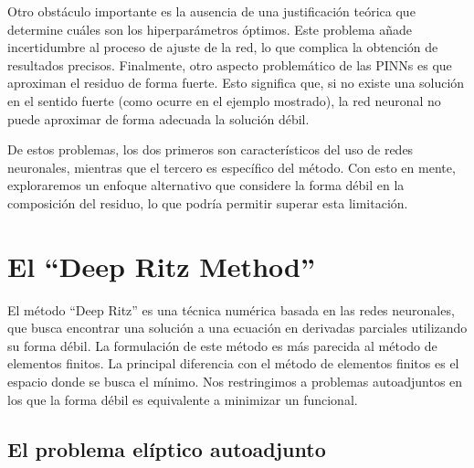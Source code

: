 \documentclass[a4paper,11pt,spanish, twoside, leqno]{tfg-uam}
\theoremstyle{definition}
\begin{document}
Otro obstáculo importante es la ausencia de una justificación teórica que determine cuáles son los hiperparámetros óptimos. Este problema añade incertidumbre al proceso de ajuste de la red, lo que complica la obtención de resultados precisos. Finalmente, otro aspecto problemático de las PINNs es que aproximan el residuo de forma fuerte. Esto significa que, si no existe una solución en el sentido fuerte (como ocurre en el ejemplo mostrado), la red neuronal no puede aproximar de forma adecuada la solución débil.

De estos problemas, los dos primeros son característicos del uso de redes neuronales, mientras que el tercero es específico del método. Con esto en mente, exploraremos un enfoque alternativo que considere la forma débil en la composición del residuo, lo que podría permitir superar esta limitación.


\section{El ``Deep Ritz Method''} \label{sec:DeepRitz}

El método ``Deep Ritz'' es una técnica numérica basada en las redes neuronales, que busca encontrar una solución a una ecuación en derivadas parciales utilizando su forma débil. La formulación de este método es más parecida al método de elementos finitos. La principal diferencia con el método de elementos finitos es el espacio donde se busca el mínimo. Nos restringimos a problemas autoadjuntos en los que la forma débil es equivalente a minimizar un funcional.



\subsection{El problema elíptico autoadjunto}\label{sec:ProblemaAutoadjunto}
\end{document}

